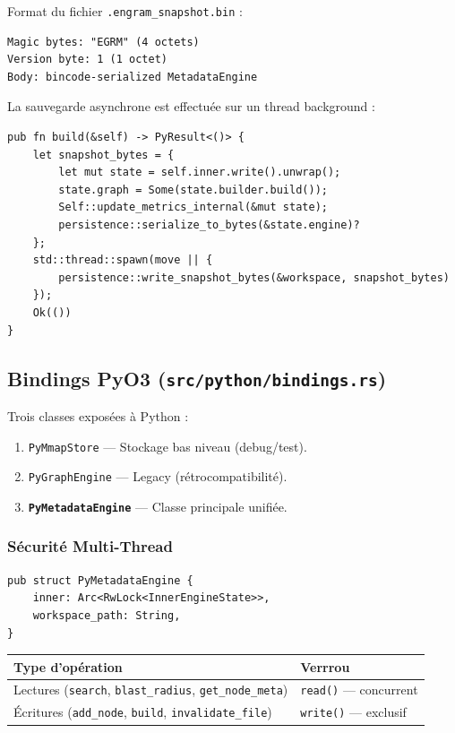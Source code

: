 \documentclass[12pt,a4paper]{article}
\newcommand{\code}[1]{\texttt{#1}}
\newcommand{\python}{\textcolor{pyblue}{Python}}
\begin{document}
Format du fichier \code{.engram\_snapshot.bin} :
\begin{lstlisting}
Magic bytes: "EGRM" (4 octets)
Version byte: 1 (1 octet)
Body: bincode-serialized MetadataEngine
\end{lstlisting}

La sauvegarde asynchrone est effectuée sur un thread background :
\begin{verbatim}
pub fn build(&self) -> PyResult<()> {
    let snapshot_bytes = {
        let mut state = self.inner.write().unwrap();
        state.graph = Some(state.builder.build());
        Self::update_metrics_internal(&mut state);
        persistence::serialize_to_bytes(&state.engine)?
    };
    std::thread::spawn(move || {
        persistence::write_snapshot_bytes(&workspace, snapshot_bytes)
    });
    Ok(())
}
\end{verbatim}

\subsection{Bindings PyO3 (\code{src/python/bindings.rs})}

Trois classes exposées à \python{} :

\begin{enumerate}
    \item \code{PyMmapStore} — Stockage bas niveau (debug/test).
    \item \code{PyGraphEngine} — Legacy (rétrocompatibilité).
    \item \textbf{\code{PyMetadataEngine}} — Classe principale unifiée.
\end{enumerate}

\subsubsection{Sécurité Multi-Thread}

\begin{verbatim}
pub struct PyMetadataEngine {
    inner: Arc<RwLock<InnerEngineState>>,
    workspace_path: String,
}
\end{verbatim}

\begin{center}
\begin{tabularx}{\textwidth}{lX}
\toprule
\textbf{Type d'opération} & \textbf{Verrrou} \\
\midrule
Lectures (\code{search}, \code{blast\_radius}, \code{get\_node\_meta}) & \code{read()} — concurrent \\
Écritures (\code{add\_node}, \code{build}, \code{invalidate\_file}) & \code{write()} — exclusif \\
\bottomrule
\end{tabularx}
\end{center}
\end{document}
